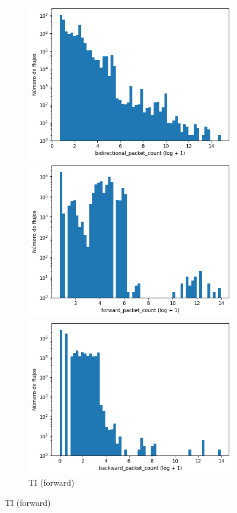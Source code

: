 \begin{figure}[H]
\begin{subfigure}[b]{0.26\textwidth}
        \includegraphics[width=\linewidth]{media/packet_pincer_toniot/bidirectional_packet_count_log_x_log_y.png}
        \caption{TI (bidir.)}
        \includegraphics[width=\textwidth]{media/packet_pincer_botiot/forward_packet_count_log_x_log_y.png}
        \caption{TI (forward)}
        \includegraphics[width=\textwidth]{media/packet_pincer_botiot/backward_packet_count_log_x_log_y.png}

\end{subfigure}
\end{figure}
